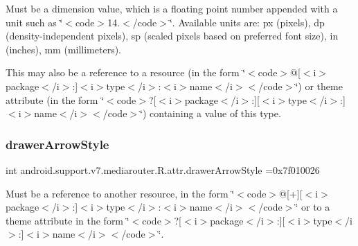 Must be a dimension value, which is a floating point number appended with a unit such as \char`\"{}$<$code$>$14.\+5sp$<$/code$>$\char`\"{}. Available units are\+: px (pixels), dp (density-\/independent pixels), sp (scaled pixels based on preferred font size), in (inches), mm (millimeters). 

This may also be a reference to a resource (in the form \char`\"{}$<$code$>$@\mbox{[}$<$i$>$package$<$/i$>$\+:\mbox{]}$<$i$>$type$<$/i$>$\+:$<$i$>$name$<$/i$>$$<$/code$>$\char`\"{}) or theme attribute (in the form \char`\"{}$<$code$>$?\mbox{[}$<$i$>$package$<$/i$>$\+:\mbox{]}\mbox{[}$<$i$>$type$<$/i$>$\+:\mbox{]}$<$i$>$name$<$/i$>$$<$/code$>$\char`\"{}) containing a value of this type. \mbox{\label{classandroid_1_1support_1_1v7_1_1mediarouter_1_1R_1_1attr_a7833ce16dc78ae79182bb9a4d850d811}} 
\subsubsection{\texorpdfstring{drawer\+Arrow\+Style}{drawerArrowStyle}}
{\footnotesize\ttfamily int android.\+support.\+v7.\+mediarouter.\+R.\+attr.\+drawer\+Arrow\+Style =0x7f010026\hspace{0.3cm}{\ttfamily [static]}}

Must be a reference to another resource, in the form \char`\"{}$<$code$>$@\mbox{[}+\mbox{]}\mbox{[}$<$i$>$package$<$/i$>$\+:\mbox{]}$<$i$>$type$<$/i$>$\+:$<$i$>$name$<$/i$>$$<$/code$>$\char`\"{} or to a theme attribute in the form \char`\"{}$<$code$>$?\mbox{[}$<$i$>$package$<$/i$>$\+:\mbox{]}\mbox{[}$<$i$>$type$<$/i$>$\+:\mbox{]}$<$i$>$name$<$/i$>$$<$/code$>$\char`\"{}. \mbox{\label{classandroid_1_1support_1_1v7_1_1mediarouter_1_1R_1_1attr_ab6e7f467aeb2525aa806ff1e7a9c3a4c}} 
